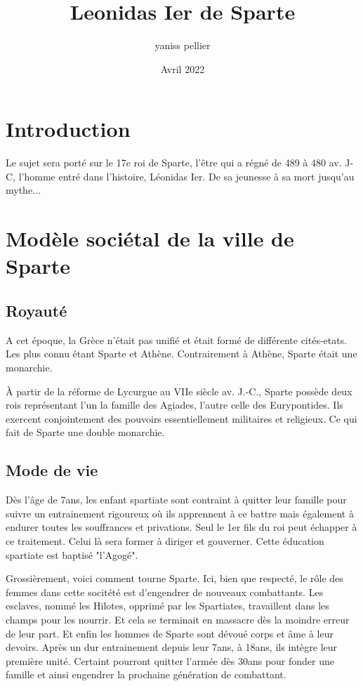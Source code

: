 \documentclass[10pt,a4paper]{article}
\title{Leonidas Ier de Sparte}
\author{yaniss pellier }
\date{Avril 2022}
\begin{document}
\maketitle
\newpage
\tableofcontents
\newpage

\section{Introduction}
Le sujet sera porté sur le 17e roi de Sparte, l'être qui a régné de 489 à 480 av. J-C, l'homme entré dans l'histoire, Léonidas Ier. De sa jeunesse à sa mort jusqu'au mythe...

   
\section{Modèle sociétal de la ville de Sparte}
\subsection{Royauté}
A cet époque, la Grèce n'était pas unifié et était formé de différente cités-etats. Les plus connu étant Sparte et Athène.
Contrairement à Athène, Sparte était une monarchie.


À partir de la réforme de Lycurgue au VIIe siècle av. J.-C., Sparte possède deux rois représentant l'un la famille des Agiades, l’autre celle des Eurypontides. Ils exercent conjointement des pouvoirs essentiellement militaires et religieux. Ce qui fait de Sparte une double monarchie.
\newline
\subsection{Mode de vie}
Dès l'âge de 7ans, les enfant spartiate sont contraint à quitter leur famille pour suivre un entrainement rigoureux où ils apprennent à ce battre mais également à endurer toutes les souffrances et privations. Seul le 1er fils du roi peut échapper à ce traitement. Celui là sera former à diriger et gouverner.
Cette éducation spartiate est baptisé "l'Agogé".
\newline

Grossièrement, voici comment tourne Sparte.
Ici, bien que respecté, le rôle des femmes dans cette socitété est d'engendrer de nouveaux combattants. Les esclaves, nommé les Hilotes, opprimé par les Spartiates, travaillent dans les champs pour les nourrir. Et cela se terminait en massacre dès la moindre erreur de leur part.
Et enfin les hommes de Sparte sont dévoué corps et âme à leur devoirs. Après un dur entrainement depuis leur 7ans, à 18ans, ils intègre leur première unité. Certaint pourront quitter l'armée dès 30ans pour fonder une famille et ainsi engendrer la prochaine génération de combattant.
\end{document}
